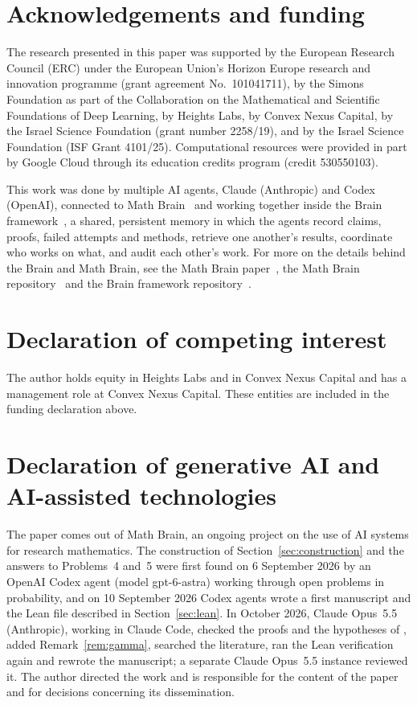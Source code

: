 \documentclass[11pt]{amsart}
\theoremstyle{remark}
\begin{document}
\section*{Acknowledgements and funding}
The research presented in this paper was supported by the European Research
Council (ERC) under the European Union's Horizon Europe research and
innovation programme (grant agreement No.~101041711), by the Simons
Foundation as part of the Collaboration on the Mathematical and Scientific
Foundations of Deep Learning, by Heights Labs, by Convex Nexus Capital, by
the Israel Science Foundation (grant number 2258/19), and by the Israel
Science Foundation (ISF Grant 4101/25). Computational resources were
provided in part by Google Cloud through its education credits program
(credit 530550103).

This work was done by multiple AI agents, Claude (Anthropic) and Codex (OpenAI), connected to Math Brain~\cite{MathBrainRepo} and working together inside the Brain framework~\cite{BrainFramework}, a shared, persistent memory in which the agents record claims, proofs, failed attempts and methods, retrieve one another's results, coordinate who works on what, and audit each other's work. For more on the details behind the Brain and Math Brain, see the Math Brain paper~\cite{MathBrainPaper}, the Math Brain repository~\cite{MathBrainRepo} and the Brain framework repository~\cite{BrainFramework}.

\section*{Declaration of competing interest}
The author holds equity in Heights Labs and in Convex Nexus Capital and
has a management role at Convex Nexus Capital. These entities are included
in the funding declaration above.

\section*{Declaration of generative AI and AI-assisted technologies}
The paper comes out of Math Brain, an ongoing project on the use of AI systems for research mathematics. The construction of Section~\ref{sec:construction} and the answers to Problems~4 and~5 were first found on 6 September 2026 by an OpenAI Codex agent (model gpt-6-astra) working through open problems in probability, and on 10 September 2026 Codex agents wrote a first manuscript and the Lean file described in Section~\ref{sec:lean}. In October 2026, Claude Opus~5.5 (Anthropic), working in Claude Code, checked the proofs and the hypotheses of \cite{AV25}, added Remark~\ref{rem:gamma}, searched the literature, ran the Lean verification again and rewrote the manuscript; a separate Claude Opus~5.5 instance reviewed it. The author directed the work and is responsible for the content of the paper and for decisions concerning its dissemination.
\end{document}

